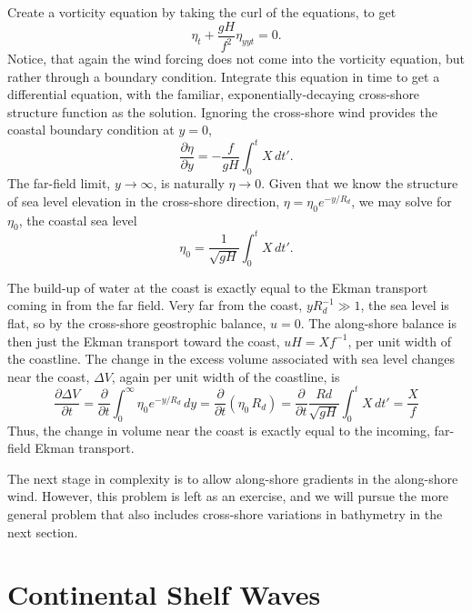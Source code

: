 \documentclass[11pt]{report}
\numberwithin{equation}{section}
\begin{document}
Create a vorticity equation by taking the curl of the equations, to get
\begin{equation}
    \eta_t + \frac{gH}{f^2} \eta_{yyt} = 0.
\end{equation}
Notice, that again the wind forcing does not come into the vorticity equation, but rather through a boundary condition.  Integrate this equation in time to get a differential equation, with the familiar, exponentially-decaying cross-shore structure function as the solution.  Ignoring the cross-shore wind provides the coastal boundary condition at $y=0$,
\begin{equation}
    \frac{\partial \eta}{\partial y} = - \frac{f}{g H} \int_0^t X\,dt'.
\end{equation}
The far-field limit, $y\rightarrow \infty$, is naturally $\eta \rightarrow 0$.  Given that we know the structure of sea level elevation in the cross-shore direction, $\eta = \eta_0 e^{-y/R_d}$, we may solve for $\eta_0$, the coastal sea level
\begin{equation}
    \eta_0 = \frac{1}{\sqrt{g H}} \int_0^t X\,dt'.
\end{equation}

The build-up of water at the coast is exactly equal to the Ekman transport coming in from the far field.  Very far from the coast, $y R_d^{-1} \gg 1$, the sea level is flat, so by the cross-shore geostrophic balance, $u=0$.  The along-shore balance is then just the Ekman transport toward the coast, $u H = X f^{-1}$, per unit width of the coastline.  The change in the excess volume associated with sea level changes near the coast, $\Delta V$, again per unit width of the coastline, is
\begin{equation}
    \frac{\partial \Delta V}{\partial t} = 
    \frac{\partial}{\partial t} \int_0^\infty \eta_0 e^{-y / R_d}\,dy =
        \frac{\partial}{\partial t} (\eta_0\,R_d) = 
        \frac{\partial}{\partial t} \frac{Rd}{\sqrt{g H}}\int_0^t X\,dt' = \frac{X}{f} 
\end{equation}
Thus, the change in volume near the coast is exactly equal to the incoming, far-field Ekman transport.

The next stage in complexity is to allow along-shore gradients in the along-shore wind.  However, this problem is left as an exercise, and we will pursue the more general problem that also includes cross-shore variations in bathymetry in the next section.  

\section{Continental Shelf Waves\\
\normalsize{\citet{gill.schumann:74}}}
\end{document}
